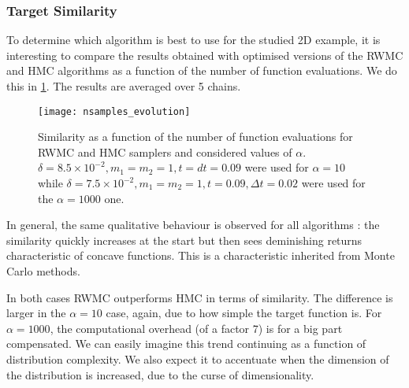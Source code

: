 \documentclass[a4paper, 12pt,oneside]{article}
\begin{document}
		\subsubsection{Target Similarity}\label{sec:target-similarity}
		To determine which algorithm is best to use for the studied 2D example, it is interesting to compare the results obtained with optimised versions of the RWMC and HMC algorithms as a function of the number of function evaluations. We do this in \ref{fig:nsamples-evolution}. The results are averaged over 5 chains.
		\begin{figure}[htb]
			\centering
				\vspace{0em}
				\texttt{[image: nsamples\_evolution]}
				\caption{Similarity as a function of the number of function evaluations for RWMC and HMC samplers and considered values of $\alpha$. $\delta=8.5\times 10^{-2},m_1=m_2=1,t=dt=0.09$ were used for $\alpha=10$ while $\delta=7.5\times 10^{-2},m_1=m_2=1,t=0.09,\Delta t=0.02$ were used for the $\alpha=1000$ one.}
				\label{fig:nsamples-evolution}
		\end{figure}
		In general, the same qualitative behaviour is observed for all algorithms : the similarity quickly increases at the start but then sees deminishing returns characteristic of concave functions. This is a characteristic inherited from Monte Carlo methods. 

		In both cases RWMC outperforms HMC in terms of similarity. 
		The difference is larger in the $\alpha=10$ case, again, due to how simple the target function is. For $\alpha=1000$, the computational overhead (of a factor 7) is for a big part compensated. We can easily imagine this trend continuing as a function of distribution complexity. We also expect it to accentuate when the dimension of the distribution is increased, due to the curse of dimensionality. 
\end{document}
